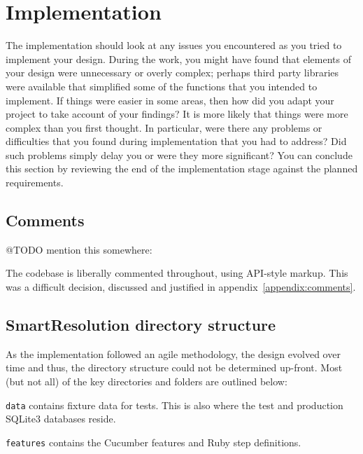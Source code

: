 \chapter{Implementation}

The implementation should look at any issues you encountered as you tried to implement your design. During the work, you might have found that elements of your design were unnecessary or overly complex; perhaps third party libraries were available that simplified some of the functions that you intended to implement. If things were easier in some areas, then how did you adapt your project to take account of your findings? It is more likely that things were more complex than you first thought. In particular, were there any problems or difficulties that you found during implementation that you had to address? Did such problems simply delay you or were they more significant? You can conclude this section by reviewing the end of the implementation stage against the planned requirements.

\section{Comments}

@TODO mention this somewhere:

The codebase is liberally commented throughout, using API-style markup. This was a difficult decision, discussed and justified in appendix~\ref{appendix:comments}.

\section{SmartResolution directory structure}

As the implementation followed an agile methodology, the design evolved over time and thus, the directory structure could not be determined up-front. Most (but not all) of the key directories and folders are outlined below:


\lstinline{data} contains fixture data for tests. This is also where the test and production SQLite3 databases reside.

\lstinline{features} contains the Cucumber features and Ruby step definitions.

